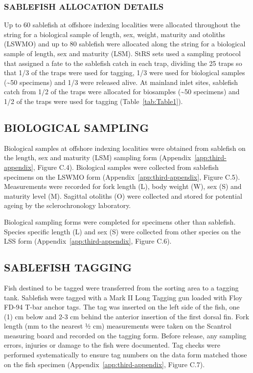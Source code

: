 \documentclass[12pt]{article}\usepackage[]{graphicx}\usepackage[]{color}
\begin{document}
\hypertarget{sablefish-allocation-details}{%
\subsubsection{SABLEFISH ALLOCATION DETAILS}\label{sablefish-allocation-details}}

Up to 60 sablefish at offshore indexing localities were allocated throughout the string for a biological sample of length, sex, weight, maturity and otoliths (LSWMO) and up to 80 sablefish were allocated along the string for a biological sample of length, sex and maturity (LSM). StRS sets used a sampling protocol that assigned a fate to the sablefish catch in each trap, dividing the 25 traps so that 1/3 of the traps were used for tagging, 1/3 were used for biological samples (\textasciitilde50 specimens) and 1/3 were released alive. At mainland inlet sites, sablefish catch from 1/2 of the traps were allocated for biosamples (\textasciitilde50 specimens) and 1/2 of the traps were used for tagging (Table~\ref{tab:Table1}).

\hypertarget{biological-sampling}{%
\subsection{BIOLOGICAL SAMPLING}\label{biological-sampling}}

Biological samples at offshore indexing localities were obtained from sablefish on the length, sex and maturity (LSM) sampling form (Appendix~\ref{app:third-appendix}, Figure C.4). Biological samples were collected from sablefish specimens on the LSWMO form (Appendix~\ref{app:third-appendix}, Figure C.5). Measurements were recorded for fork length (L), body weight (W), sex (S) and maturity level (M). Sagittal otoliths (O) were collected and stored for potential ageing by the sclerochronology laboratory.

Biological sampling forms were completed for specimens other than sablefish. Species specific length (L) and sex (S) were collected from other species on the LSS form (Appendix~\ref{app:third-appendix}, Figure C.6).

\hypertarget{sablefish-tagging}{%
\subsection{SABLEFISH TAGGING}\label{sablefish-tagging}}

Fish destined to be tagged were transferred from the sorting area to a tagging tank. Sablefish were tagged with a Mark II Long Tagging gun loaded with Floy FD-94 T-bar anchor tags. The tag was inserted on the left side of the fish, one (1) cm below and 2-3 cm behind the anterior insertion of the first dorsal fin. Fork length (mm to the nearest ½ cm) measurements were taken on the Scantrol measuring board and recorded on the tagging form. Before release, any sampling errors, injuries or damage to the fish were documented. Tag checks were performed systematically to ensure tag numbers on the data form matched those on the fish specimen (Appendix~\ref{app:third-appendix}, Figure C.7).
\end{document}
